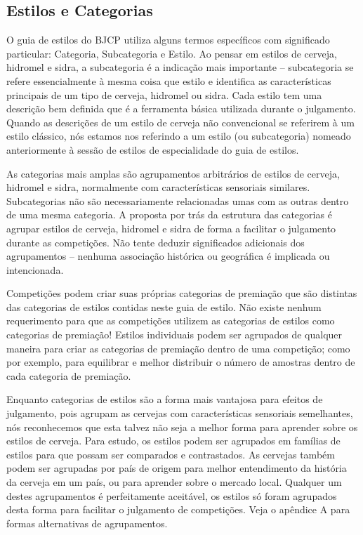 \subsection*{Estilos e Categorias}
O guia de estilos do BJCP utiliza alguns termos específicos com significado particular: Categoria, Subcategoria e Estilo. Ao pensar em estilos de cerveja, hidromel e sidra, a subcategoria é a indicação mais importante – subcategoria se refere essencialmente à mesma coisa que estilo e identifica as características principais de um tipo de cerveja, hidromel ou sidra. Cada estilo tem uma descrição bem definida que é a ferramenta básica utilizada durante o julgamento. \\

Quando as descrições de um estilo de cerveja não convencional se referirem à um estilo clássico, nós estamos nos referindo a um estilo (ou subcategoria) nomeado anteriormente à sessão de estilos de especialidade do guia de estilos.

As categorias mais amplas são agrupamentos arbitrários de estilos de cerveja, hidromel e sidra, normalmente com características sensoriais similares. Subcategorias não são necessariamente relacionadas umas com as outras dentro de uma mesma categoria. A proposta por trás da estrutura das categorias é agrupar estilos de cerveja, hidromel e sidra de forma a facilitar o julgamento durante as competições. Não tente deduzir significados adicionais dos agrupamentos – nenhuma associação histórica ou geográfica é implicada ou intencionada.

Competições podem criar suas próprias categorias de premiação que são distintas das categorias de estilos contidas neste guia de estilo. Não existe nenhum requerimento para que as competições utilizem as categorias de estilos como categorias de premiação! Estilos individuais podem ser agrupados de qualquer maneira para criar as categorias de premiação dentro de uma competição; como por exemplo, para equilibrar e melhor distribuir o número de amostras dentro de cada categoria de premiação.

Enquanto categorias de estilos são a forma mais vantajosa para efeitos de julgamento, pois agrupam as cervejas com características sensoriais semelhantes, nós reconhecemos que esta talvez não seja a melhor forma para aprender sobre os estilos de cerveja. Para estudo, os estilos podem ser agrupados em famílias de estilos para que possam ser comparados e contrastados. As cervejas também podem ser agrupadas por país de origem para melhor entendimento da história da cerveja em um país, ou para aprender sobre o mercado local. Qualquer um destes agrupamentos é perfeitamente aceitável, os estilos só foram agrupados desta forma para facilitar o julgamento de competições. Veja o apêndice A para formas alternativas de agrupamentos.